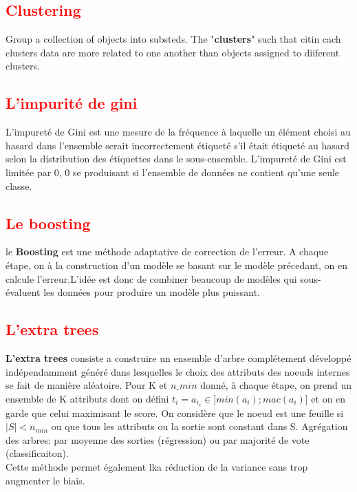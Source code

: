 \subsection{\textcolor{red}{Clustering}}
Group a collection of objects into substeds. The "\textbf{clusters}" such that citin cach clusters data are more related to one another than objects assigned to diiferent clusters.

\subsection{\textcolor{red}{L'impurité de gini}}
L'impureté de Gini est une mesure de la fréquence à laquelle un élément choisi au hasard dans l'ensemble serait incorrectement étiqueté s'il était étiqueté au hasard selon la distribution des étiquettes dans le sous-ensemble. L'impureté de Gini est limitée par 0, 0 se produisant si l'ensemble de données ne contient qu'une seule classe. 

\subsection{\textcolor{red}{Le boosting}}
le \textbf{Boosting} est une méthode adaptative de correction de l'erreur. A chaque étape, on à la construction d'un modèle se basant sur le modèle précedant, on en calcule l'erreur.L'idée est donc de combiner beaucoup de modèles qui sous-évaluent les données pour produire un modèle plus puissant.

\subsection{\textcolor{red}{L'extra trees}}
\textbf{L'extra trees} consiste a construire un ensemble d'arbre complétement développé indépendamment généré dans lesquelles le choix des attributs des noeuds internes se fait de manière aléatoire. Pour K et $n\_{min}$ donné, à chaque étape, on prend un ensemble de K attributs dont on défini $t_i = a_{i_c} \in ]min(a_i); mac(a_i)]$ et on en garde que celui maximisant le score. On considère que le noeud est une feuille si $|S| < n_{min}$ ou que tous les attributs ou la sortie sont constant dans S. Agrégation des arbres: par moyenne des sorties (régression) ou par majorité de vote (classificaiton).\\
Cette méthode permet également lka réduction de la variance sans trop augmenter le biais.